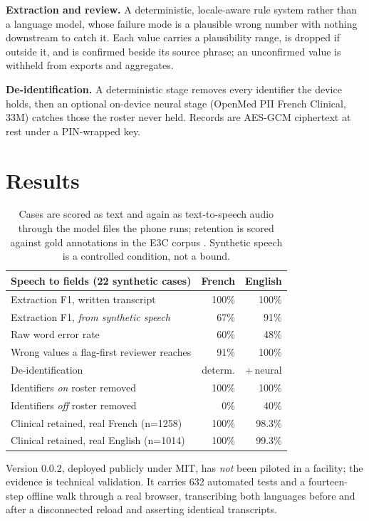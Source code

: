\documentclass[10pt,letterpaper]{article}
\providecommand{\citep}{\cite}
\begin{document}
\textbf{Extraction and review.} A deterministic, locale-aware rule system
rather than a language model, whose failure mode is a plausible wrong number
with nothing downstream to catch it. Each value carries a plausibility range,
is dropped if outside it, and is confirmed beside its source phrase; an
unconfirmed value is withheld from exports and aggregates.

\textbf{De-identification.} A deterministic stage removes every identifier the
device holds, then an optional on-device neural stage (OpenMed PII French
Clinical, 33M) \citep{openmed2025} catches those the roster never held. Records are
AES-GCM ciphertext at rest under a PIN-wrapped key.

\section{Results}

\begin{table}[t]
\centering\footnotesize
\begin{tabular}{lrr}
\toprule
Speech to fields (22 synthetic cases) & French & English \\
\midrule
Extraction F1, written transcript & 100\% & 100\% \\
Extraction F1, \emph{from synthetic speech} & 67\% & 91\% \\
Raw word error rate & 60\% & 48\% \\
Wrong values a flag-first reviewer reaches & 91\% & 100\% \\
\midrule
De-identification & determ. & +\,neural \\
\midrule
Identifiers \emph{on} roster removed & 100\% & 100\% \\
Identifiers \emph{off} roster removed & 0\% & 40\% \\
Clinical retained, real French (n=1258) & 100\% & 98.3\% \\
Clinical retained, real English (n=1014) & 100\% & 99.3\% \\
\bottomrule
\end{tabular}
\caption{Cases are scored as text and again as text-to-speech audio through the
model files the phone runs; retention is scored against gold annotations in the
E3C corpus \citep{magnini2021e3c}. Synthetic speech is a controlled condition,
not a bound.}
\end{table}

Version 0.0.2, deployed publicly under MIT, has \emph{not} been piloted in a
facility; the evidence is technical validation. It carries 632 automated tests
and a fourteen-step offline walk through a real browser, transcribing both
languages before and after a disconnected reload and asserting identical
transcripts.
\end{document}
